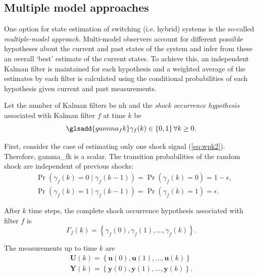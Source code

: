 \subsection{Multiple model approaches}

One option for state estimation of switching (i.e. hybrid) systems is the so-called \textit{multiple-model approach}. Multi-model observers account for different possible hypotheses about the current and past states of the system and infer from these an overall `best' estimate of the current states. To achieve this, an independent Kalman filter is maintained for each hypothesis and a weighted average of the estimates by each filter is calculated using the conditional probabilities of each hypothesis given current and past measurements.

Let the number of Kalman filters be \gls{nh} and the \textit{shock occurrence hypothesis} associated with Kalman filter $f$ at time $k$ be
\begin{equation} \label{eq:gammak} \glsadd{gamma_fk}
	\gamma_{f}(k) \in \left\{0, 1 \right\} \forall{k \ge 0}.
\end{equation}

First, consider the case of estimating only one shock signal (\ref{eq:wpk2}). Therefore, \gls{gamma_fk} is a scalar. The transition probabilities of the random shock are independent of previous shocks:
\begin{equation} \label{eq:Pr_gammak_given_gammakm1}
	\begin{aligned}
		& \Pr\left(\gamma_{f}(k)=0 \mid \gamma_{f}(k-1)\right) = \Pr\left(\gamma_{f}(k)=0\right) = 1-\epsilon, \\
		& \Pr\left(\gamma_{f}(k)=1 \mid \gamma_{f}(k-1)\right) = \Pr\left(\gamma_{f}(k)=1\right) = \epsilon.
	\end{aligned}
\end{equation}

After $k$ time steps, the complete shock occurrence hypothesis associated with filter $f$ is
\begin{equation} \label{eq:Gammak}
	\Gamma_f(k) = \left\{ \gamma_f(0), \gamma_f(1), ..., \gamma_f(k) \right\}.
\end{equation}

The measurements up to time $k$ are
\begin{equation} \label{eq:Uk_Yk}
	\begin{aligned}
		\mathbf{U}(k) = \left\{ \mathbf{u}(0), \mathbf{u}(1), ..., \mathbf{u}(k) \right\} \\
		\mathbf{Y}(k) = \left\{ \mathbf{y}(0), \mathbf{y}(1), ..., \mathbf{y}(k) \right\}.
	\end{aligned}
\end{equation}

